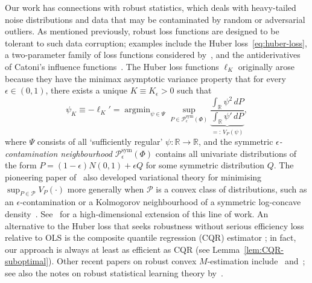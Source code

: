 \documentclass[a4paper]{article}
\newcommand{\R}{\mathbb{R}}
\DeclareMathOperator*{\argmin}{argmin}
\theoremstyle{definition}
\begin{document}
Our work has connections with robust statistics, which deals with heavy-tailed noise distributions and data that may be contaminated by random or adversarial outliers. As mentioned previously, robust loss functions are designed to be tolerant to such data corruption; examples include the Huber loss~\eqref{eq:huber-loss}, a two-parameter family of loss functions considered by~\citet{barron2019general}, and the antiderivatives of Catoni's influence functions~\citep{catoni2012challenging}.  The Huber loss functions $\ell_K$ originally arose because they have the minimax asymptotic variance property that for every $\epsilon \in (0,1)$, there exists a unique $K \equiv K_\epsilon > 0$ such that
\[
\psi_K \equiv -\ell_K' = \argmin_{\psi \in \Psi} \sup_{P \in \mathcal{P}_\epsilon^{\mathrm{sym}}(\Phi)} \underbrace{\frac{\int_\R \psi^2\,dP}{\int_\R \psi'\,dP}}_{=:\,V_P(\psi)},
\]
where $\Psi$ consists of all `sufficiently regular' $\psi \colon \R \to \R$, and the symmetric \textit{$\epsilon$-contamination neighbourhood} $\mathcal{P}_\epsilon^{\mathrm{sym}}(\Phi)$ contains all univariate distributions of the form $P = (1 - \epsilon)N(0,1) + \epsilon Q$ for some symmetric distribution $Q$. The pioneering paper of~\citet{huber1964robust} also developed variational theory for minimising $\sup_{P \in \mathcal{P}}V_P(\cdot)$ more generally when $\mathcal{P}$ is a convex class of distributions, such as an $\epsilon$-contamination or a Kolmogorov neighbourhood of a symmetric log-concave density~\citep[Section~4.5]{huber2009robust}. See~\citet{donoho2015variance} for a high-dimensional extension of this line of work. An alternative to the Huber loss that seeks robustness without serious efficiency loss relative to OLS is the composite quantile regression (CQR) estimator \citep{zou2008composite,yang2024multiple}; in fact, our approach is always at least as efficient as CQR (see Lemma~\ref{lem:CQR-suboptimal}).  Other recent papers on robust convex $M$-estimation include~\citet{chinot2020robust} and~\citet{brunel2023geodesically}; see also the notes on robust statistical learning theory by~\citet{lerasle2019selected}.
\end{document}
